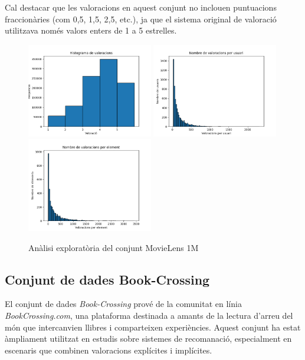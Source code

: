 \documentclass[a4paper,12pt]{report}
\begin{document}
Cal destacar que les valoracions en aquest conjunt no inclouen puntuacions fraccionàries (com 0,5, 1,5, 2,5, etc.), ja que el sistema original de valoració utilitzava només valors enters de 1 a 5 estrelles.

\begin{figure}[H]
    \centering
    \includegraphics[width=0.49\textwidth]{Figuras/ml-1m-ratings.png}
    \hfill
    \includegraphics[width=0.49\textwidth]{Figuras/ml-1m-users.png}
    \hfill
    \includegraphics[width=0.49\textwidth]{Figuras/ml-1m-items.png}
    \caption{Anàlisi exploratòria del conjunt MovieLens 1M}
    \label{fig:analisis_ml_1m}
\end{figure}

\subsection{Conjunt de dades Book-Crossing}

El conjunt de dades \emph{Book-Crossing} \cite{ziegler2005improving} prové de la comunitat en línia \emph{BookCrossing.com}, una plataforma destinada a amants de la lectura d’arreu del món que intercanvien llibres i comparteixen experiències. Aquest conjunt ha estat àmpliament utilitzat en estudis sobre sistemes de recomanació, especialment en escenaris que combinen valoracions explícites i implícites.
\end{document}
